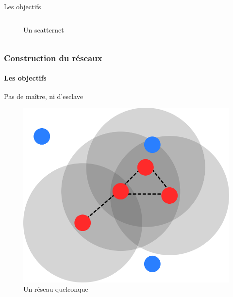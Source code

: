 \documentclass{beamer}
\begin{document}
\begin{frame}
\begin{small}
\begin{block}{Les objectifs}
\begin{columns}
\begin{column}{.5\textwidth}
\begin{figure}
\begin{center}
                  \label{fig:scatternet}
                  \caption{Un scatternet}
                \end{center}
              \end{figure}
            \end{column}
          \end{columns}
        \end{block}
      \end{small}
    \end{frame}
    \begin{frame}
      \frametitle{Construction du réseaux}
      \framesubtitle{Les objectifs}
      \begin{block}{Pas de maître, ni d'esclave}
        \begin{figure}
          \begin{center}
            \includegraphics[width=.4\textwidth]{images/reseau_quelconque.png}
            \caption{Un réseau quelconque}
            \label{fig:quelconque}
          \end{center}
        \end{figure}
      \end{block}
    \end{frame}
\end{document}
